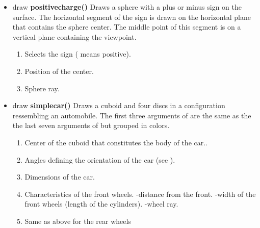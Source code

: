\begin{itemize}
\item draw {\bfseries positivecharge()} Draws a sphere with a
plus or minus sign on the surface. The horizontal
segment of the sign is drawn on the horizontal plane
that contains the sphere center. The middle point of
this segment is on a vertical plane containing the
viewpoint.
\begin{enumerate}
\item {} Selects the sign (
means positive).
\item {} Position of the center.
\item {} Sphere ray.
\end{enumerate}

\item draw {\bfseries simplecar()} Draws a cuboid and four
discs in a configuration ressembling an automobile. The
first three arguments of  are the same
as the the last seven arguments of 
but grouped in colors.
\begin{enumerate}
\item {} Center of the cuboid that
constitutes the body of the car..
\item {} Angles defining the orientation
of the car (see ).
\item {} Dimensions of the car.
\item {} Characteristics of the front
wheels. -distance from the
front. -width of the front wheels (length
of the cylinders). -wheel ray.
\item {} Same as above for the rear wheels
\end{enumerate}



\end{itemize}
